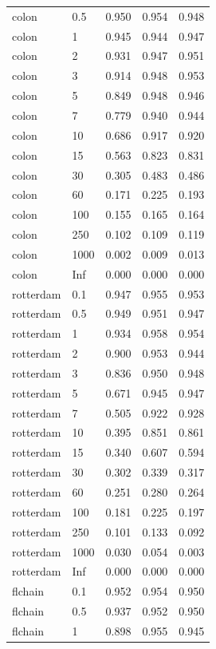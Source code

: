 \begin{tabular}{llrrr}
  colon & 0.5 & 0.950 & 0.954 & 0.948 \\ 
  colon & 1 & 0.945 & 0.944 & 0.947 \\ 
  colon & 2 & 0.931 & 0.947 & 0.951 \\ 
  colon & 3 & 0.914 & 0.948 & 0.953 \\ 
  colon & 5 & 0.849 & 0.948 & 0.946 \\ 
  colon & 7 & 0.779 & 0.940 & 0.944 \\ 
  colon & 10 & 0.686 & 0.917 & 0.920 \\ 
  colon & 15 & 0.563 & 0.823 & 0.831 \\ 
  colon & 30 & 0.305 & 0.483 & 0.486 \\ 
  colon & 60 & 0.171 & 0.225 & 0.193 \\ 
  colon & 100 & 0.155 & 0.165 & 0.164 \\ 
  colon & 250 & 0.102 & 0.109 & 0.119 \\ 
  colon & 1000 & 0.002 & 0.009 & 0.013 \\ 
  colon & Inf & 0.000 & 0.000 & 0.000 \\ 
  rotterdam & 0.1 & 0.947 & 0.955 & 0.953 \\ 
  rotterdam & 0.5 & 0.949 & 0.951 & 0.947 \\ 
  rotterdam & 1 & 0.934 & 0.958 & 0.954 \\ 
  rotterdam & 2 & 0.900 & 0.953 & 0.944 \\ 
  rotterdam & 3 & 0.836 & 0.950 & 0.948 \\ 
  rotterdam & 5 & 0.671 & 0.945 & 0.947 \\ 
  rotterdam & 7 & 0.505 & 0.922 & 0.928 \\ 
  rotterdam & 10 & 0.395 & 0.851 & 0.861 \\ 
  rotterdam & 15 & 0.340 & 0.607 & 0.594 \\ 
  rotterdam & 30 & 0.302 & 0.339 & 0.317 \\ 
  rotterdam & 60 & 0.251 & 0.280 & 0.264 \\ 
  rotterdam & 100 & 0.181 & 0.225 & 0.197 \\ 
  rotterdam & 250 & 0.101 & 0.133 & 0.092 \\ 
  rotterdam & 1000 & 0.030 & 0.054 & 0.003 \\ 
  rotterdam & Inf & 0.000 & 0.000 & 0.000 \\ 
  flchain & 0.1 & 0.952 & 0.954 & 0.950 \\ 
  flchain & 0.5 & 0.937 & 0.952 & 0.950 \\ 
  flchain & 1 & 0.898 & 0.955 & 0.945 \\ 

\end{tabular}
